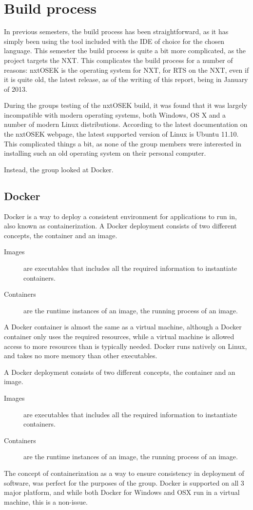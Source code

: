 \section{Build process}\label{sec:buildprocess}
In previous semesters, the build process has been straightforward, as it has simply been using the tool included with the IDE of choice for the chosen language.
This semester the build process is quite a bit more complicated, as the project targets the NXT.
This complicates the build process for a number of reasons:
nxtOSEK is the operating system for NXT, for RTS on the NXT, even if it is quite old, the latest release, as of the writing of this report, being in January of 2013\cite{osekrelease}.

During the groups testing of the nxtOSEK build, it was found that it was largely incompatible with modern operating systems, both Windows, OS X and a number of modern Linux distributions.
According to the latest documentation on the nxtOSEK webpage, the latest supported version of Linux is Ubuntu 11.10.
This complicated things a bit, as none of the group members were interested in installing such an old operating system on their personal computer.

Instead, the group looked at Docker.
\subsection{Docker}\label{subsec:docker}
Docker is a way to deploy a consistent environment for applications to run in, also known as containerization\cite{dockerdocstart}.
A Docker deployment consists of two different concepts, the container and an image.
\begin{description}
    \item [Images] are executables that includes all the required information to instantiate containers.
    \item[Containers] are the runtime instances of an image, the running process of an image.
\end{description}

A Docker container is almost the same as a virtual machine, although a Docker container only uses the required resources, while a virtual machine is allowed access to more resources than is typically needed.
Docker runs natively on Linux, and takes no more memory than other executables.

A Docker deployment consists of two different concepts, the container and an image.
\begin{description}
    \item[Images] are executables that includes all the required information to instantiate containers.
    \item[Containers] are the runtime instances of an image, the running process of an image.
\end{description}
The concept of containerization as a way to ensure consistency in deployment of software, was perfect for the purposes of the group.
Docker is supported on all 3 major platform, and while both Docker for Windows and OSX run in a virtual machine, this is a non-issue.

